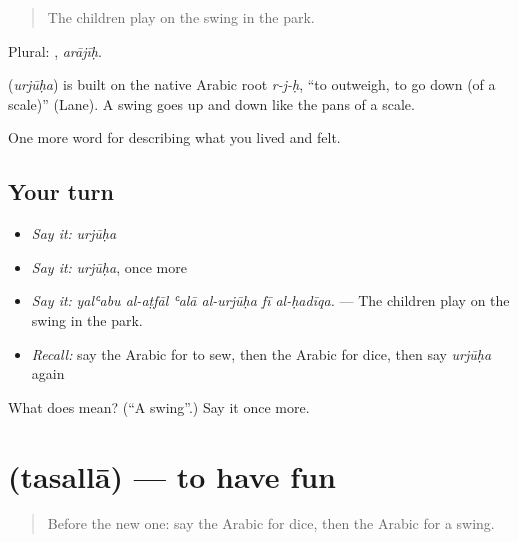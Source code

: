 \begin{quote}
The children play on the swing in the park.
\end{quote}

Plural: , \emph{arājīḥ}.

\begin{cousinweb}
\textbf{} (\emph{urjūḥa}) is built on the native Arabic root \emph{r-j-ḥ}, \textquotedblleft{}to outweigh, to go down (of a scale)\textquotedblright{} (Lane). A swing goes up and down like the pans of a scale.
\end{cousinweb}

\begin{grammarlens}[title={What you've built}]
One more word for describing what you lived and felt.
\end{grammarlens}

\subsection*{Your turn}
\begin{itemize}
\raggedright
  \item \emph{Say it:} \emph{urjūḥa}
  \item \emph{Say it:} \emph{urjūḥa}, once more
  \item \emph{Say it:} \emph{yalʿabu al-aṭfāl ʿalā al-urjūḥa fī al-ḥadīqa.} — The children play on the swing in the park.
  \item \emph{Recall:} say the Arabic for to sew, then the Arabic for dice, then say \emph{urjūḥa} again
\end{itemize}

\begin{tcolorbox}[breakable,colback=teal!4,colframe=teal!35!black,title={Before you move on}]
What does  mean? (\textquotedblleft{}A swing\textquotedblright{}.) Say it once more.
\end{tcolorbox}
\section[\texorpdfstring{\ar{تسلى} (tasallā)}{تسلى (tasallā)}]{ (tasallā) — to have fun}

\label{lesson:AR-C539-tasalla}



\begin{quote}
Before the new one: say the Arabic for dice, then the Arabic for a swing.
\end{quote}

